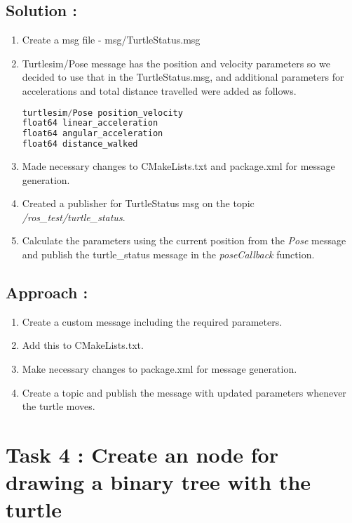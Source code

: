 \documentclass[12pt]{article}
\begin{document}
\subsection{Solution :}
\begin{enumerate}
\item Create a msg file - msg/TurtleStatus.msg
\item Turtlesim/Pose message has the position and velocity parameters so we decided to use that in the TurtleStatus.msg, and additional parameters for accelerations and total distance travelled were added as follows.
\begin{lstlisting}[language=c++]
turtlesim/Pose position_velocity
float64 linear_acceleration
float64 angular_acceleration
float64 distance_walked
\end{lstlisting}
\item Made necessary changes to CMakeLists.txt and package.xml for message generation.
\item Created a publisher for TurtleStatus msg on the topic \textit{/ros\_test/turtle\_status}.
\item Calculate the parameters using the current position from the \textit{Pose} message and publish the turtle\_status message in the \textit{poseCallback} function.
\end{enumerate}

\subsection{Approach :}
\begin{enumerate}
\item Create a custom message including the required parameters.
\item Add this to CMakeLists.txt.
\item Make necessary changes to package.xml for message generation.
\item Create a topic and publish the message with updated parameters whenever the turtle moves.
\end{enumerate}

\newpage


\section{Task 4 : Create an node for drawing a binary tree with the turtle}

\end{document}
